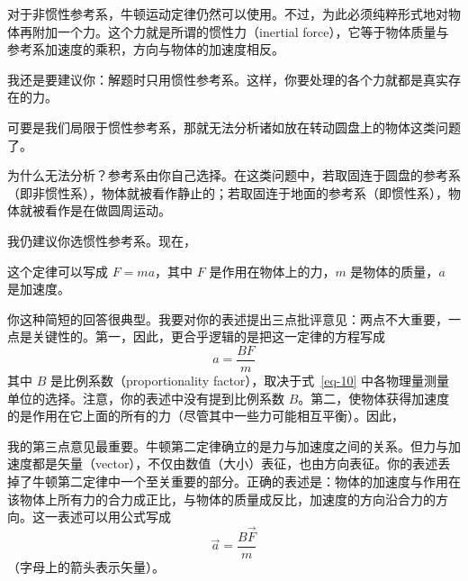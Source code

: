 \begin{dialogue}
\tchr 对于非惯性参考系，牛顿运动定律仍然可以使用。不过，为此必须纯粹形式地对物体再附加一个力。这个力就是所谓的惯性力（inertial force），它等于物体质量与参考系加速度的乘积，方向与物体的加速度相反。

我还是要建议你：解题时只用惯性参考系。这样，你要处理的各个力就都是真实存在的力。

\std 可要是我们局限于惯性参考系，那就无法分析诸如放在转动圆盘上的物体这类问题了。

\tchr 为什么无法分析？参考系由你自己选择。在这类问题中，若取固连于圆盘的参考系（即非惯性系），物体就被看作静止的；若取固连于地面的参考系（即惯性系），物体就被看作是在做圆周运动。

我仍建议你选惯性参考系。现在，

\std 这个定律可以写成 $F=ma$，其中 $F$ 是作用在物体上的力，$m$ 是物体的质量，$a$ 是加速度。

\tchr 你这种简短的回答很典型。我要对你的表述提出三点批评意见：两点不大重要，一点是关键性的。第一，因此，更合乎逻辑的是把这一定律的方程写成
\begin{equation}%
a=\frac{BF}{m}
\label{eq-10}
\end{equation}
其中 $B$ 是比例系数（proportionality factor），取决于式~\eqref{eq-10} 中各物理量测量单位的选择。注意，你的表述中没有提到比例系数 $B$。第二，使物体获得加速度的是作用在它上面的所有的力（尽管其中一些力可能相互平衡）。因此，

我的第三点意见最重要。牛顿第二定律确立的是力与加速度之间的关系。但力与加速度都是矢量（vector），不仅由数值（大小）表征，也由方向表征。你的表述丢掉了牛顿第二定律中一个至关重要的部分。正确的表述是：物体的加速度与作用在该物体上所有力的合力成正比，与物体的质量成反比，加速度的方向沿合力的方向。这一表述可以用公式写成
\begin{equation}%
\vec{a}=\frac{B\vec{F}}{m}
\label{eq-11}
\end{equation}
（字母上的箭头表示矢量）。


\end{dialogue}
